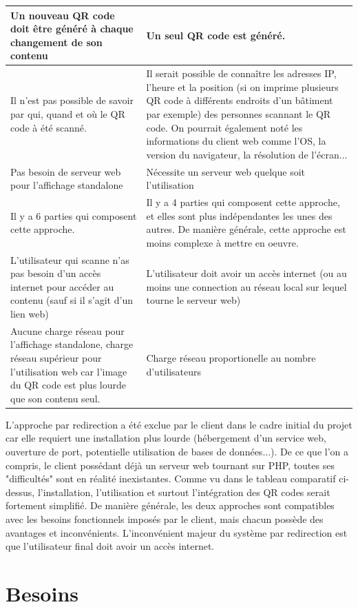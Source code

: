 \documentclass[a4paper,12pt]{article}
\begin{document}
\begin{longtable}{ | m{} | m{} | }
    \hline
    Un nouveau QR code doit être généré à chaque changement de son contenu & Un seul QR code est généré.\\
    \hline
    Il n'est pas possible de savoir par qui, quand et où le QR code à été scanné. & Il serait possible de connaître les adresses IP, l'heure et la position (si on imprime plusieurs QR code à différents endroits d'un bâtiment par exemple) des personnes scannant le QR code. On pourrait également noté les informations du client web comme l'OS, la version du navigateur, la résolution de l'écran...\\
    \hline
    Pas besoin de serveur web pour l'affichage standalone & Nécessite un serveur web quelque soit l'utilisation \\ 
    \hline
    Il y a 6 parties qui composent cette approche. & Il y a 4 parties qui composent cette approche, et elles sont plus indépendantes les unes des autres. De manière générale, cette approche est moins complexe à mettre en oeuvre.\\
    \hline
    L'utilisateur qui scanne n'as pas besoin d'un accès internet pour accéder au contenu (sauf si il s'agit d'un lien web) &  L'utilisateur doit avoir un accès internet (ou au moins une connection au réseau local sur lequel tourne le serveur web)\\ 
    \hline
    Aucune charge réseau pour l'affichage standalone, charge réseau supérieur pour l'utilisation web car l'image du QR code est plus lourde que son contenu seul. & Charge réseau proportionelle au nombre d'utilisateurs\\
    \hline
    \end{longtable}

\bigskip
L'approche par redirection a été exclue par le client dans le cadre initial du projet car elle requiert une installation plus lourde (hébergement d'un service web, ouverture de port, potentielle utilisation de bases de données...). De ce que l'on a compris, le client possédant déjà un serveur web tournant sur PHP, toutes ses "difficultés" sont en réalité inexistantes. Comme vu dans le tableau comparatif ci-dessus, l'installation, l'utilisation et surtout l'intégration des QR codes serait fortement simplifié. De manière générale, les deux approches sont compatibles avec les besoins fonctionnels imposés par le client, mais chacun possède des avantages et inconvénients. L'inconvénient majeur du système par redirection est que l'utilisateur final doit avoir un accès internet.


\section{Besoins}
\end{document}
